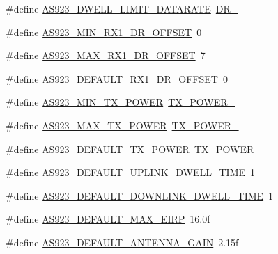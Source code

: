 \begin{DoxyCompactItemize}
\item 
\#define \mbox{\hyperlink{group___r_e_g_i_o_n_a_s923_gab4d42ec6203089aa346cd55d90eb769e}{A\+S923\+\_\+\+D\+W\+E\+L\+L\+\_\+\+L\+I\+M\+I\+T\+\_\+\+D\+A\+T\+A\+R\+A\+TE}}~\mbox{\hyperlink{group___r_e_g_i_o_n_gad402daa928a8b3dea829315fab69de17}{D\+R\+\_}}
\item 
\#define \mbox{\hyperlink{group___r_e_g_i_o_n_a_s923_gaaa342c4c9e6db79d8949112c19f7422f}{A\+S923\+\_\+\+M\+I\+N\+\_\+\+R\+X1\+\_\+\+D\+R\+\_\+\+O\+F\+F\+S\+ET}}~0
\item 
\#define \mbox{\hyperlink{group___r_e_g_i_o_n_a_s923_ga92034d0c71c7943562cbebd114ed6f5e}{A\+S923\+\_\+\+M\+A\+X\+\_\+\+R\+X1\+\_\+\+D\+R\+\_\+\+O\+F\+F\+S\+ET}}~7
\item 
\#define \mbox{\hyperlink{group___r_e_g_i_o_n_a_s923_ga2c6ea009afd46f07baae802b336ff76d}{A\+S923\+\_\+\+D\+E\+F\+A\+U\+L\+T\+\_\+\+R\+X1\+\_\+\+D\+R\+\_\+\+O\+F\+F\+S\+ET}}~0
\item 
\#define \mbox{\hyperlink{group___r_e_g_i_o_n_a_s923_gab5c796398b9a3a599d43ce34dd0e3dec}{A\+S923\+\_\+\+M\+I\+N\+\_\+\+T\+X\+\_\+\+P\+O\+W\+ER}}~\mbox{\hyperlink{group___r_e_g_i_o_n_ga3c7bd9a98f0c1e7e9aaa90857c4bd700}{T\+X\+\_\+\+P\+O\+W\+E\+R\+\_}}
\item 
\#define \mbox{\hyperlink{group___r_e_g_i_o_n_a_s923_ga572944e6a8933722a954e4cee98fa0ee}{A\+S923\+\_\+\+M\+A\+X\+\_\+\+T\+X\+\_\+\+P\+O\+W\+ER}}~\mbox{\hyperlink{group___r_e_g_i_o_n_gab33618449f2a573142c463ab071ef8ed}{T\+X\+\_\+\+P\+O\+W\+E\+R\+\_}}
\item 
\#define \mbox{\hyperlink{group___r_e_g_i_o_n_a_s923_ga98e64bdbc74253fbec5119d43ceb5903}{A\+S923\+\_\+\+D\+E\+F\+A\+U\+L\+T\+\_\+\+T\+X\+\_\+\+P\+O\+W\+ER}}~\mbox{\hyperlink{group___r_e_g_i_o_n_gab33618449f2a573142c463ab071ef8ed}{T\+X\+\_\+\+P\+O\+W\+E\+R\+\_}}
\item 
\#define \mbox{\hyperlink{group___r_e_g_i_o_n_a_s923_gafaa21368b605c5313a0c3ac76bfd908c}{A\+S923\+\_\+\+D\+E\+F\+A\+U\+L\+T\+\_\+\+U\+P\+L\+I\+N\+K\+\_\+\+D\+W\+E\+L\+L\+\_\+\+T\+I\+ME}}~1
\item 
\#define \mbox{\hyperlink{group___r_e_g_i_o_n_a_s923_gab7c581030f301fc7ada92555da15ad23}{A\+S923\+\_\+\+D\+E\+F\+A\+U\+L\+T\+\_\+\+D\+O\+W\+N\+L\+I\+N\+K\+\_\+\+D\+W\+E\+L\+L\+\_\+\+T\+I\+ME}}~1
\item 
\#define \mbox{\hyperlink{group___r_e_g_i_o_n_a_s923_ga626ba6fc6eb81535fe6f325a4ec47b90}{A\+S923\+\_\+\+D\+E\+F\+A\+U\+L\+T\+\_\+\+M\+A\+X\+\_\+\+E\+I\+RP}}~16.\+0f
\item 
\#define \mbox{\hyperlink{group___r_e_g_i_o_n_a_s923_ga4a2faf56603f9d0feb2c105632a5b005}{A\+S923\+\_\+\+D\+E\+F\+A\+U\+L\+T\+\_\+\+A\+N\+T\+E\+N\+N\+A\+\_\+\+G\+A\+IN}}~2.\+15f

\end{DoxyCompactItemize}
